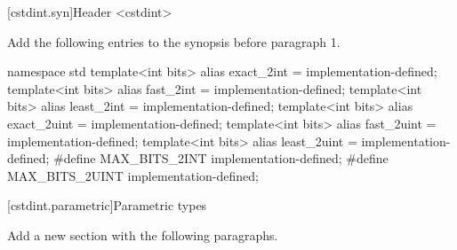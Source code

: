 [cstdint.syn]{Header <cstdint>}

Add the following entries to the synopsis before paragraph 1.

\begin{addedblock}
\begin{codeblock}
namespace std {
  template<int bits> alias exact_2int = implementation-defined;
  template<int bits> alias fast_2int = implementation-defined;
  template<int bits> alias least_2int = implementation-defined;
  template<int bits> alias exact_2uint = implementation-defined;
  template<int bits> alias fast_2uint = implementation-defined;
  template<int bits> alias least_2uint = implementation-defined;
}
#define MAX_BITS_2INT implementation-defined;
#define MAX_BITS_2UINT implementation-defined;
\end{codeblock}    
\end{addedblock}

[cstdint.parametric]{Parametric types}

Add a new section with the following paragraphs.

